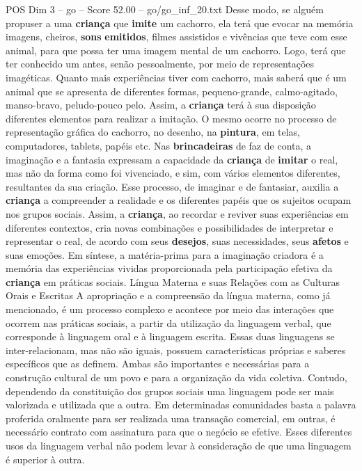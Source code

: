 \begin{textsample}{POS Dim 3 – go – Score 52.00 – go/go\_inf\_20.txt}
Desse modo, se alguém propuser a uma \textbf{criança} que \textbf{imite} um cachorro, ela terá que evocar na memória imagens, cheiros, \textbf{sons} \textbf{emitidos}, filmes assistidos e vivências que teve com esse animal, para que possa ter uma imagem mental de um cachorro.
Logo, terá que ter conhecido um antes, senão pessoalmente, por meio de representações imagéticas.
Quanto mais experiências tiver com cachorro, mais saberá que é um animal que se apresenta de diferentes formas, pequeno-grande, calmo-agitado, manso-bravo, peludo-pouco pelo.
Assim, a \textbf{criança} terá à sua disposição diferentes elementos para realizar a imitação.
O mesmo ocorre no processo de representação gráfica do cachorro, no desenho, na \textbf{pintura}, em telas, computadores, tablets, papéis etc.
Nas \textbf{brincadeiras} de faz de conta, a imaginação e a fantasia expressam a capacidade da \textbf{criança} de \textbf{imitar} o real, mas não da forma como foi vivenciado, e sim, com vários elementos diferentes, resultantes da sua criação.
Esse processo, de imaginar e de fantasiar, auxilia a \textbf{criança} a compreender a realidade e os diferentes papéis que os sujeitos ocupam nos grupos sociais.
Assim, a \textbf{criança}, ao recordar e reviver suas experiências em diferentes contextos, cria novas combinações e possibilidades de interpretar e representar o real, de acordo com seus \textbf{desejos}, suas necessidades, seus \textbf{afetos} e suas emoções.
Em síntese, a matéria-prima para a imaginação criadora é a memória das experiências vividas proporcionada pela participação efetiva da \textbf{criança} em práticas sociais.
Língua Materna e suas Relações com as Culturas Orais e Escritas A apropriação e a compreensão da língua materna, como já mencionado, é um processo complexo e acontece por meio das interações que ocorrem nas práticas sociais, a partir da utilização da linguagem verbal, que corresponde à linguagem oral e à linguagem escrita.
Essas duas linguagens se inter-relacionam, mas não são iguais, possuem características próprias e saberes específicos que as definem.
Ambas são importantes e necessárias para a construção cultural de um povo e para a organização da vida coletiva.
Contudo, dependendo da constituição dos grupos sociais uma linguagem pode ser mais valorizada e utilizada que a outra.
Em determinadas comunidades basta a palavra proferida oralmente para ser realizada uma transação comercial, em outras, é necessário contrato com assinatura para que o negócio se efetive.
Esses diferentes usos da linguagem verbal não podem levar à consideração de que uma linguagem é superior à outra.

\end{textsample}
